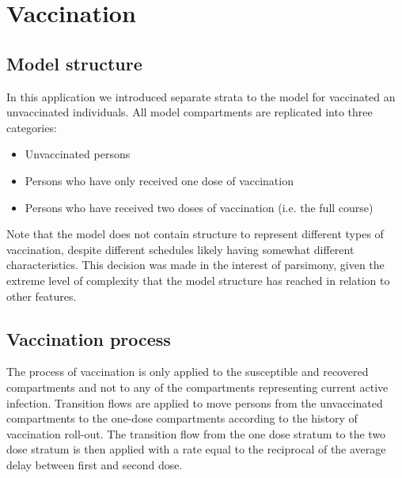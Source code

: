 \section{Vaccination}

\subsection{Model structure}
In this application we introduced separate strata to the model for vaccinated an unvaccinated individuals.
All model compartments are replicated into three categories:

\begin{itemize}
	\item Unvaccinated persons
	\item Persons who have only received one dose of vaccination
	\item Persons who have received two doses of vaccination (i.e. the full course)
\end{itemize}

Note that the model does not contain structure to represent different types of vaccination, despite different schedules likely having somewhat different characteristics.
This decision was made in the interest of parsimony, given the extreme level of complexity that the model structure has reached in relation to other features.

\subsection{Vaccination process}
The process of vaccination is only applied to the susceptible and recovered compartments and not to any of the compartments representing current active infection.
Transition flows are applied to move persons from the unvaccinated compartments to the one-dose compartments according to the history of vaccination roll-out.
The transition flow from the one dose stratum to the two dose stratum is then applied with a rate equal to the reciprocal of the average delay between first and second dose.
